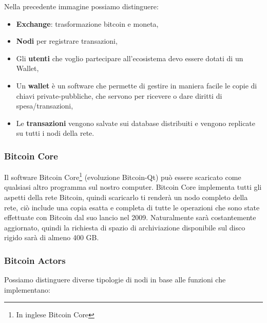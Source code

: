 Nella precedente immagine possiamo distinguere:

\begin{itemize}
    \item \textbf{Exchange}: trasformazione bitcoin e moneta,
    \item \textbf{Nodi} per registrare transazioni,
    \item Gli \textbf{utenti} che voglio partecipare all'ecosistema devo essere
          dotati di un Wallet,
    \item Un \textbf{wallet} è un software che permette
          di gestire in maniera facile le copie di chiavi private-pubbliche, che
          servono per ricevere o dare diritti di spesa/transazioni,
    \item Le \textbf{transazioni} vengono salvate sui database distribuiti e
          vengono replicate su tutti i nodi della rete.
\end{itemize}

\subsubsection{Bitcoin Core}

Il software Bitcoin Core\footnote{In inglese Bitcoin Core
    } (evoluzione Bitcoin-Qt) può essere scaricato come
qualsiasi altro programma sul nostro computer. Bitcoin Core implementa tutti
gli aspetti della rete Bitcoin, quindi scaricarlo ti renderà un nodo
completo della rete, ciò include una copia esatta e completa di tutte le
operazioni che sono state effettuate con Bitcoin dal suo lancio nel 2009.
Naturalmente sarà costantemente aggiornato, quindi la richiesta di spazio di
archiviazione disponibile sul disco rigido sarà di almeno 400 GB.

\subsubsection{Bitcoin Actors}

Possiamo distinguere diverse tipologie di nodi in base alle funzioni che
implementano:


